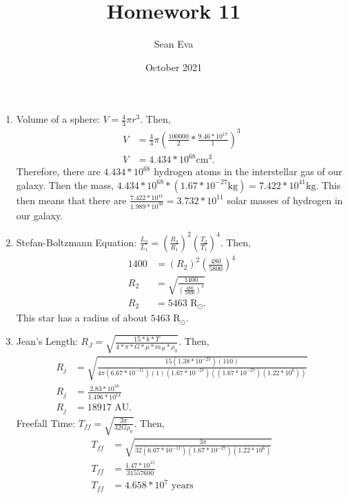 \documentclass{article}
\title{Homework 11}
\author{Sean Eva}
\date{October 2021}
\begin{document}
\maketitle

\begin{enumerate}
    \item 
    
    Volume of a sphere: $V= \frac{4}{3}\pi r^3$. Then,
    \begin{align*}
        V &= \frac{4}{3}\pi (\frac{100000}{2}*\frac{9.46*10^{17}}{1})^3\\
        V &= 4.434*10^{68} \text{cm}^3.
    \end{align*} Therefore, there are $4.434*10^{68}$ hydrogen atoms in the interstellar gas of our galaxy. Then the mass, $4.434*10^{68} * (1.67*10^{-27} \text{kg}) = 7.422*10^{41}\text{kg}$. This then means that there are $\frac{7.422*10^{41}}{1.989*10^{30}} = 3.732*10^{11}$ solar masses of hydrogen in our galaxy.
    
    \item
    
    Stefan-Boltzmann Equation: $\frac{L_2}{L_1} = (\frac{R_2}{R_1})^2(\frac{T_2}{T_1})^4$. Then,
    \begin{align*}
        1400 &= (R_2)^2 (\frac{480}{5800})^4\\
        R_2 &= \sqrt{\frac{1400}{(\frac{480}{5800})^4}}\\
        R_2 &= 5463 \text{ R}_\odot.
    \end{align*}This star has a radius of about $5463 \text{ R}_\odot$.
    
    \item
    
    Jean's Length: $R_J = \sqrt{\frac{15*k*T}{4*\pi*G*\mu*m_H*\rho_0}}$. Then,
    \begin{align*}
        R_j &= \sqrt{\frac{15(1.38*10^{-23})(110)}{4\pi (6.67*10^{-11})(1)(1.67*10^{-27})((1.67*10^{-27})(1.22*10^6))}}\\
        R_j &= \frac{2.83*10^{18}}{1.496*10^{14}}\\
        R_j &= 18917\text{ AU}.
    \end{align*}
    Freefall Time: $T_{ff} = \sqrt{\frac{3\pi}{32G\rho_0}}$. Then,
    \begin{align*}
        T_{ff} &= \sqrt{\frac{3\pi}{32(6.67*10^{-11})(1.67*10^{-27})(1.22*10^6)}}\\
        T_{ff} &= \frac{1.47*10^{15}}{31557600}\\
        T_{ff} &= 4.658*10^{7} \text{ years}
    \end{align*}
    
\end{enumerate}
\end{document}
